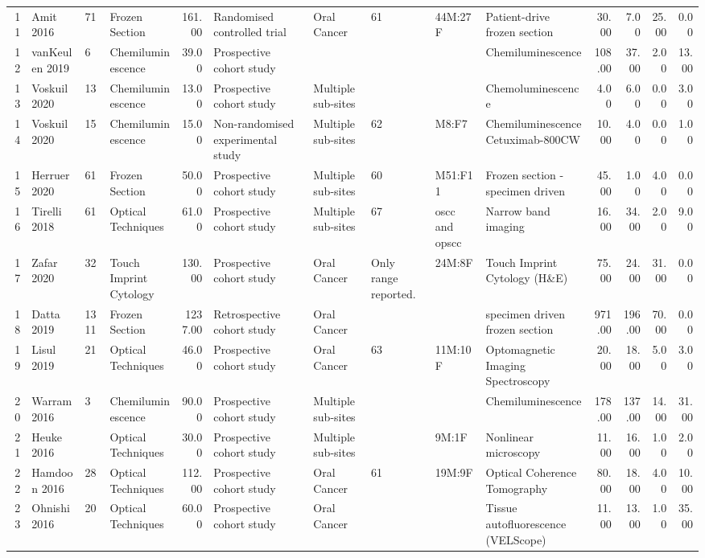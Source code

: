 \begin{table}[ht]
\begin{tabular}{rlllrlllllrrrr}
  11 & Amit 2016 & 71 & Frozen Section & 161.00 & Randomised controlled trial & Oral Cancer & 61 & 44M:27F & Patient-drive frozen section & 30.00 & 7.00 & 25.00 & 0.00 \\ 
  12 & vanKeulen 2019 & 6 & Chemiluminescence & 39.00 & Prospective cohort study &  &  &  & Chemiluminescence & 108.00 & 37.00 & 2.00 & 13.00 \\ 
  13 & Voskuil 2020 & 13 & Chemiluminescence & 13.00 & Prospective cohort study & Multiple sub-sites &  &  & Chemoluminescence & 4.00 & 6.00 & 0.00 & 3.00 \\ 
  14 & Voskuil 2020 & 15 & Chemiluminescence & 15.00 & Non-randomised experimental study & Multiple sub-sites & 62 & M8:F7 & Chemiluminescence Cetuximab-800CW & 10.00 & 4.00 & 0.00 & 1.00 \\ 
  15 & Herruer 2020 & 61 & Frozen Section & 50.00 & Prospective cohort study & Multiple sub-sites & 60 & M51:F11 & Frozen section - specimen driven & 45.00 & 1.00 & 4.00 & 0.00 \\ 
  16 & Tirelli 2018 & 61 & Optical Techniques & 61.00 & Prospective cohort study & Multiple sub-sites & 67 & oscc and opscc & Narrow band imaging & 16.00 & 34.00 & 2.00 & 9.00 \\ 
  17 & Zafar 2020 & 32 & Touch Imprint Cytology & 130.00 & Prospective cohort study & Oral Cancer & Only range reported. & 24M:8F & Touch Imprint Cytology (H\&E) & 75.00 & 24.00 & 31.00 & 0.00 \\ 
  18 & Datta 2019 & 1311 & Frozen Section & 1237.00 & Retrospective cohort study & Oral Cancer &  &  & specimen driven frozen section & 971.00 & 196.00 & 70.00 & 0.00 \\ 
  19 & Lisul 2019 & 21 & Optical Techniques & 46.00 & Prospective cohort study & Oral Cancer & 63 & 11M:10F & Optomagnetic Imaging Spectroscopy & 20.00 & 18.00 & 5.00 & 3.00 \\ 
  20 & Warram 2016 & 3 & Chemiluminescence & 90.00 & Prospective cohort study & Multiple sub-sites &  &  & Chemiluminescence & 178.00 & 137.00 & 14.00 & 31.00 \\ 
  21 & Heuke 2016 &  & Optical Techniques & 30.00 & Prospective cohort study & Multiple sub-sites &  & 9M:1F & Nonlinear microscopy & 11.00 & 16.00 & 1.00 & 2.00 \\ 
  22 & Hamdoon 2016 & 28 & Optical Techniques & 112.00 & Prospective cohort study & Oral Cancer & 61 & 19M:9F & Optical Coherence Tomography & 80.00 & 18.00 & 4.00 & 10.00 \\ 
  23 & Ohnishi 2016 & 20 & Optical Techniques & 60.00 & Prospective cohort study & Oral Cancer &  &  & Tissue autofluorescence (VELScope) & 11.00 & 13.00 & 1.00 & 35.00 \\ 

\end{tabular}
\end{table}
